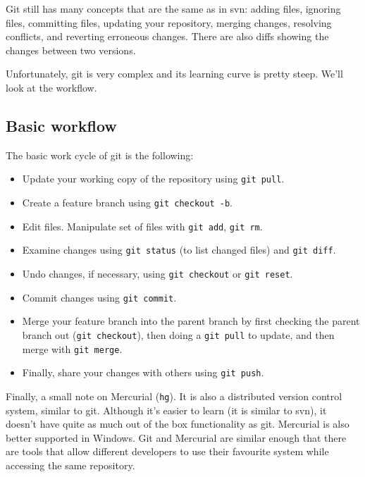 Git still has many concepts that are the same as in svn: adding files, ignoring files, committing files, updating your repository, merging changes, resolving conflicts, and reverting erroneous changes. There are also diffs showing the changes between two versions.

Unfortunately, git is very complex and its learning curve is pretty steep. We'll look at the workflow.

\subsection*{Basic workflow}
The basic work cycle of git is the following:
\begin{itemize}
\item Update your working copy of the repository using {\tt git pull}.
\item Create a feature branch using {\tt git checkout -b}.
\item Edit files. Manipulate set of files with {\tt git add}, {\tt git rm}.
\item Examine changes using {\tt git status} (to list changed files)
  and {\tt git diff}.
\item Undo changes, if necessary, using {\tt git checkout} or {\tt git reset}.
\item Commit changes using {\tt git commit}.
\item Merge your feature branch into the parent branch by first checking the parent branch out ({\tt git checkout}), then doing a {\tt git pull} to update, and then merge with {\tt git merge}.
\item Finally, share your changes with others using {\tt git push}.
\end{itemize}

Finally, a small note on Mercurial (\texttt{hg}). It is also a distributed version control system, similar to git. Although it's easier to learn (it is similar to svn), it doesn't have quite as much out of the box functionality as git. Mercurial is also better supported in Windows. Git and Mercurial are similar enough that there are tools that allow different developers to use their favourite system while accessing the same repository.




